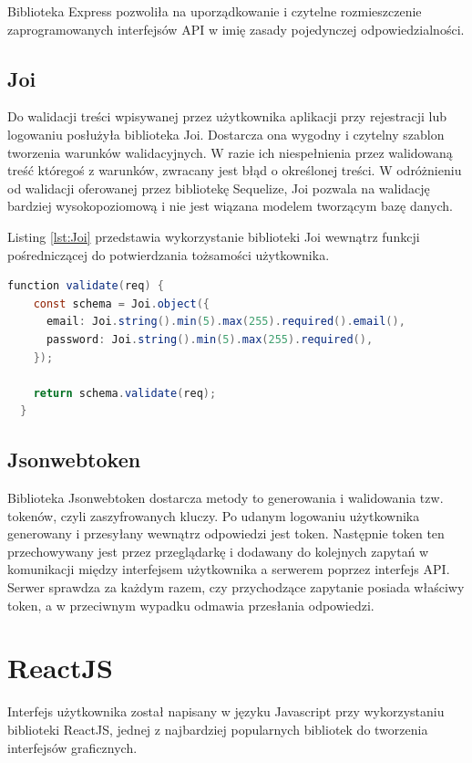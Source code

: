 \documentclass{sprz}
\begin{document}
Biblioteka Express pozwoliła na uporządkowanie i czytelne rozmieszczenie zaprogramowanych interfejsów API w imię zasady pojedynczej odpowiedzialności.

\subsection*{Joi}

Do walidacji treści wpisywanej przez użytkownika aplikacji przy rejestracji lub logowaniu posłużyła biblioteka Joi. Dostarcza ona wygodny i czytelny szablon tworzenia warunków walidacyjnych. W razie ich niespełnienia przez walidowaną treść któregoś z warunków, zwracany jest błąd o określonej treści. W odróżnieniu od walidacji oferowanej przez bibliotekę Sequelize, Joi pozwala na walidację bardziej wysokopoziomową i nie jest wiązana modelem tworzącym bazę danych.

Listing \ref{lst:Joi} przedstawia wykorzystanie biblioteki Joi wewnątrz funkcji pośredniczącej do potwierdzania tożsamości użytkownika.

\begin{lstlisting}[language=Java,caption={Przykład wykorzystania Joi}, label={lst:Joi}]
  function validate(req) {
    const schema = Joi.object({
      email: Joi.string().min(5).max(255).required().email(),
      password: Joi.string().min(5).max(255).required(),
    });
  
    return schema.validate(req);
  }
\end{lstlisting}

\subsection*{Jsonwebtoken}

Biblioteka Jsonwebtoken dostarcza metody to generowania i walidowania tzw. tokenów, czyli zaszyfrowanych kluczy. Po udanym logowaniu użytkownika generowany i przesyłany wewnątrz odpowiedzi jest token. Następnie token ten przechowywany jest przez przeglądarkę i dodawany do kolejnych zapytań w komunikacji między interfejsem użytkownika a serwerem poprzez interfejs API. Serwer sprawdza za każdym razem, czy przychodzące zapytanie posiada właściwy token, a w przeciwnym wypadku odmawia przesłania odpowiedzi.

\section{ReactJS}

Interfejs użytkownika został napisany w języku Javascript przy wykorzystaniu biblioteki ReactJS, jednej z najbardziej popularnych bibliotek do tworzenia interfejsów graficznych.
\end{document}
